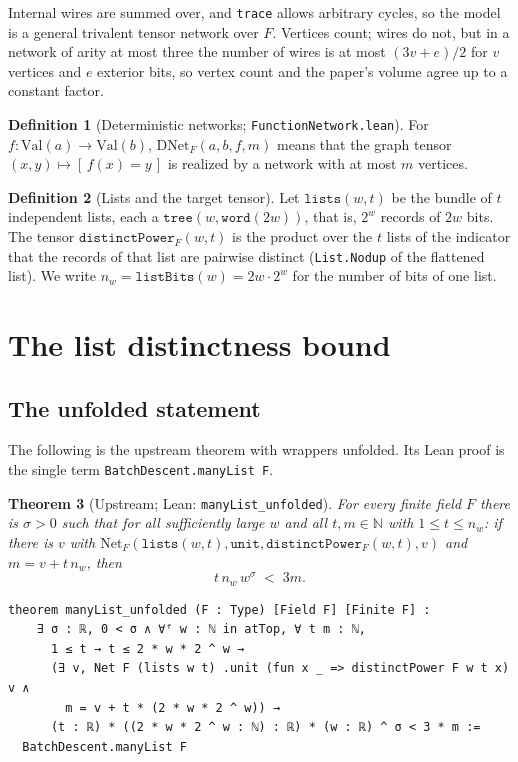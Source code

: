 \documentclass[11pt]{amsart}
\newtheorem{theorem}{Theorem}[section]
\theoremstyle{definition}
\newtheorem{definition}[theorem]{Definition}
\theoremstyle{remark}
\newcommand{\N}{\mathbb{N}}
\newcommand{\lean}[1]{\texttt{#1}}
\newcommand{\Net}{\mathrm{Net}}
\newcommand{\DNet}{\mathrm{DNet}}
\newcommand{\Val}{\mathrm{Val}}
\newcommand{\ind}[1]{[\,#1\,]}
\begin{document}
Internal wires are summed over, and \lean{trace} allows arbitrary cycles, so the model is a general trivalent tensor network over $F$. Vertices count; wires do not, but in a network of arity at most three the number of wires is at most $(3v+e)/2$ for $v$ vertices and $e$ exterior bits, so vertex count and the paper's volume agree up to a constant factor.

\begin{definition}[Deterministic networks; \lean{FunctionNetwork.lean}]
For $f\colon\Val(a)\to\Val(b)$, $\DNet_F(a,b,f,m)$ means that the graph tensor $(x,y)\mapsto\ind{f(x)=y}$ is realized by a network with at most $m$ vertices.
\end{definition}

\begin{definition}[Lists and the target tensor]
Let $\mathtt{lists}(w,t)$ be the bundle of $t$ independent lists, each a $\mathtt{tree}(w,\mathtt{word}(2w))$, that is, $2^w$ records of $2w$ bits. The tensor $\mathtt{distinctPower}_F(w,t)$ is the product over the $t$ lists of the indicator that the records of that list are pairwise distinct (\lean{List.Nodup} of the flattened list). We write $n_w=\mathtt{listBits}(w)=2w\cdot 2^w$ for the number of bits of one list.
\end{definition}

\section{The list distinctness bound}\label{sec:manylist}

\subsection{The unfolded statement}
The following is the upstream theorem with wrappers unfolded. Its Lean proof is the single term \lean{BatchDescent.manyList F}.

\begin{theorem}[Upstream; Lean: \lean{manyList\_unfolded}]\label{thm:manylist}
For every finite field $F$ there is $\sigma>0$ such that for all sufficiently large $w$ and all $t,m\in\N$ with $1\le t\le n_w$: if there is $v$ with $\Net_F(\mathtt{lists}(w,t),\mathtt{unit},\mathtt{distinctPower}_F(w,t),v)$ and $m=v+t\,n_w$, then
\[ t\,n_w\,w^{\sigma} \;<\; 3m. \]
\end{theorem}

\begin{lstlisting}
theorem manyList_unfolded (F : Type) [Field F] [Finite F] :
    ∃ σ : ℝ, 0 < σ ∧ ∀ᶠ w : ℕ in atTop, ∀ t m : ℕ,
      1 ≤ t → t ≤ 2 * w * 2 ^ w →
      (∃ v, Net F (lists w t) .unit (fun x _ => distinctPower F w t x) v ∧
        m = v + t * (2 * w * 2 ^ w)) →
      (t : ℝ) * ((2 * w * 2 ^ w : ℕ) : ℝ) * (w : ℝ) ^ σ < 3 * m :=
  BatchDescent.manyList F
\end{lstlisting}
\end{document}
